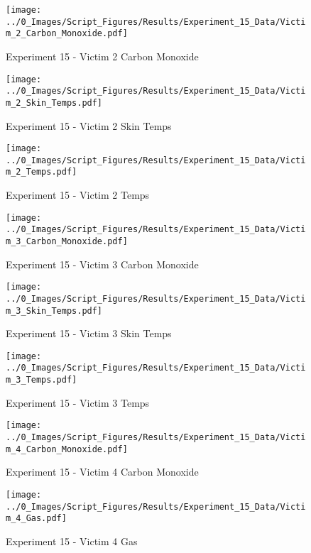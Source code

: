 	\begin{figure}[H]
		\centering
		\texttt{[image: ../0\_Images/Script\_Figures/Results/Experiment\_15\_Data/Victim\_2\_Carbon\_Monoxide.pdf]}
		\caption[]{Experiment 15 - Victim 2 Carbon Monoxide}
	\end{figure}
 
	\clearpage

	\begin{figure}[H]
		\centering
		\texttt{[image: ../0\_Images/Script\_Figures/Results/Experiment\_15\_Data/Victim\_2\_Skin\_Temps.pdf]}
		\caption[]{Experiment 15 - Victim 2 Skin Temps}
	\end{figure}
 

	\begin{figure}[H]
		\centering
		\texttt{[image: ../0\_Images/Script\_Figures/Results/Experiment\_15\_Data/Victim\_2\_Temps.pdf]}
		\caption[]{Experiment 15 - Victim 2 Temps}
	\end{figure}
 
	\clearpage

	\begin{figure}[H]
		\centering
		\texttt{[image: ../0\_Images/Script\_Figures/Results/Experiment\_15\_Data/Victim\_3\_Carbon\_Monoxide.pdf]}
		\caption[]{Experiment 15 - Victim 3 Carbon Monoxide}
	\end{figure}
 

	\begin{figure}[H]
		\centering
		\texttt{[image: ../0\_Images/Script\_Figures/Results/Experiment\_15\_Data/Victim\_3\_Skin\_Temps.pdf]}
		\caption[]{Experiment 15 - Victim 3 Skin Temps}
	\end{figure}
 
	\clearpage

	\begin{figure}[H]
		\centering
		\texttt{[image: ../0\_Images/Script\_Figures/Results/Experiment\_15\_Data/Victim\_3\_Temps.pdf]}
		\caption[]{Experiment 15 - Victim 3 Temps}
	\end{figure}
 

	\begin{figure}[H]
		\centering
		\texttt{[image: ../0\_Images/Script\_Figures/Results/Experiment\_15\_Data/Victim\_4\_Carbon\_Monoxide.pdf]}
		\caption[]{Experiment 15 - Victim 4 Carbon Monoxide}
	\end{figure}
 
	\clearpage

	\begin{figure}[H]
		\centering
		\texttt{[image: ../0\_Images/Script\_Figures/Results/Experiment\_15\_Data/Victim\_4\_Gas.pdf]}
		\caption[]{Experiment 15 - Victim 4 Gas}
	\end{figure}
 

